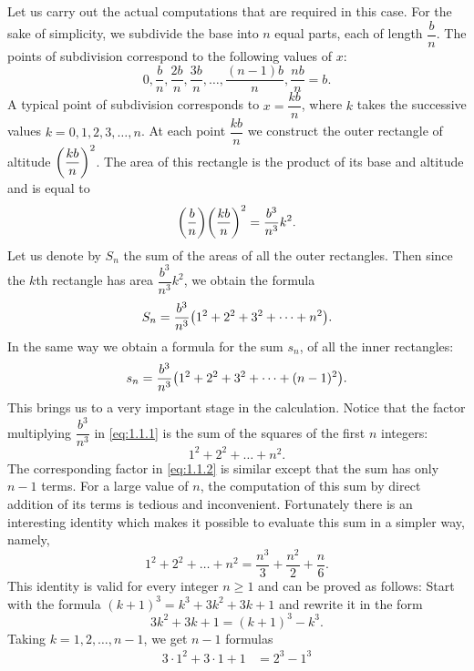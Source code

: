\begin{note}
  Let us carry out the actual computations that are required in this case.
  For the sake of simplicity, we subdivide the base into \(n\) equal parts, each of length \(\dfrac{b}{n}\).
  The points of subdivision correspond to the following values of \(x\):
  \[
    0, \dfrac{b}{n}, \dfrac{2b}{n}, \dfrac{3b}{n}, \dots, \dfrac{(n - 1) b}{n}, \dfrac{nb}{n} = b.
  \]
  A typical point of subdivision corresponds to \(x = \dfrac{kb}{n}\), where \(k\) takes the successive values \(k = 0, 1, 2, 3, \dots, n\).
  At each point \(\dfrac{kb}{n}\) we construct the outer rectangle of altitude \(\left\lparen\dfrac{kb}{n}\right\rparen^2\).
  The area of this rectangle is the product of its base and altitude and is equal to
  \[
    \pa{\dfrac{b}{n}} \pa{\dfrac{kb}{n}}^2 = \dfrac{b^3}{n^3} k^2.
  \]
  Let us denote by \(S_n\) the sum of the areas of all the outer rectangles.
  Then since the \(k\)th rectangle has area \(\dfrac{b^3}{n^3} k^2\), we obtain the formula
  \begin{equation}\label{eq:1.1.1}
    S_n = \dfrac{b^3}{n^3} \pa{1^2 + 2^2 + 3^2 + \dots + n^2}.
  \end{equation}
  In the same way we obtain a formula for the sum \(s_n\), of all the inner rectangles:
  \begin{equation}\label{eq:1.1.2}
    s_n = \dfrac{b^3}{n^3} \pa{1^2 + 2^2 + 3^2 + \dots + (n - 1)^2}.
  \end{equation}
  This brings us to a very important stage in the calculation.
  Notice that the factor multiplying \(\dfrac{b^3}{n^3}\) in \cref{eq:1.1.1} is the sum of the squares of the first \(n\) integers:
  \[
    1^2 + 2^2 + \dots + n^2.
  \]
  The corresponding factor in \cref{eq:1.1.2} is similar except that the sum has only \(n - 1\) terms.
  For a large value of \(n\), the computation of this sum by direct addition of its terms is tedious and inconvenient.
  Fortunately there is an interesting identity which makes it possible to evaluate this sum in a simpler way, namely,
  \begin{equation}\label{eq:1.1.3}
    1^2 + 2^2 + \dots + n^2 = \dfrac{n^3}{3} + \dfrac{n^2}{2} + \dfrac{n}{6}.
  \end{equation}
  This identity is valid for every integer \(n \geq 1\) and can be proved as follows:
  Start with the formula \((k + 1)^3 = k^3 + 3 k^2 + 3k + 1\) and rewrite it in the form
  \[
    3 k^2 + 3k + 1 = (k + 1)^3 - k^3.
  \]
  Taking \(k = 1, 2, \dots, n - 1\), we get \(n - 1\) formulas
  \begin{align*}
    3 \cdot 1^2 + 3 \cdot 1 + 1             & = 2^3 - 1^3        \\

\end{align*}
\end{note}
